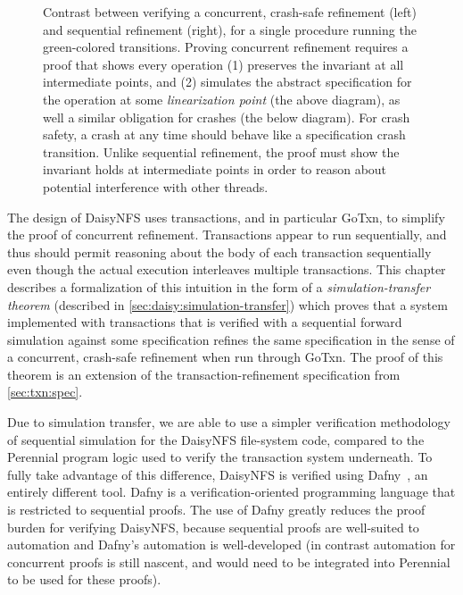 \begin{figure}
\begin{subfigure}[m]{0.4\textwidth}
  \label{fig:refinement:seq}
  \end{subfigure}
  \vspace{0.5\baselineskip}
  \caption[Concurrent, crash-safe simulation vs sequential simulation]{Contrast between verifying a
    concurrent, crash-safe refinement (left) and sequential refinement (right), for a single
    procedure running the green-colored transitions. Proving concurrent
    refinement requires a proof that shows every operation (1) preserves the
    invariant at all intermediate points, and (2) simulates the abstract
    specification for the operation at some \emph{linearization point} (the
    above diagram), as well
    a similar obligation for crashes (the below diagram). For
    crash safety, a crash at any time should behave like a specification crash transition. Unlike
    sequential refinement, the proof must show the invariant holds at
    intermediate points in order to reason about potential interference with
    other threads.}

  \label{fig:concurrent-refinement}
\end{figure}


The design of DaisyNFS uses transactions, and in particular GoTxn, to simplify
the proof of concurrent refinement. Transactions appear to run
sequentially, and thus should permit reasoning about the body of each
transaction sequentially even though the actual execution interleaves multiple
transactions. This chapter describes a formalization of this intuition in the
form of a \emph{simulation-transfer theorem} (described in
\cref{sec:daisy:simulation-transfer}) which proves that a system implemented
with transactions that is verified with a sequential forward simulation against
some specification refines the same specification in the sense of a concurrent,
crash-safe refinement when run through GoTxn. The proof of this theorem is an
extension of the transaction-refinement specification from \cref{sec:txn:spec}.

Due to simulation transfer, we are able to use a simpler verification
methodology of sequential simulation for the DaisyNFS file-system code, compared
to the Perennial program logic used to verify the transaction system underneath.
To fully take advantage of this difference, DaisyNFS is verified using
Dafny~\cite{leino:dafny}, an entirely different tool. Dafny is a
verification-oriented programming language that is restricted to sequential
proofs. The use of Dafny greatly reduces the proof burden for verifying
DaisyNFS, because sequential proofs are well-suited to automation and Dafny's
automation is well-developed (in contrast automation for concurrent proofs is
still nascent, and would need to be integrated into Perennial to be used for
these proofs).

